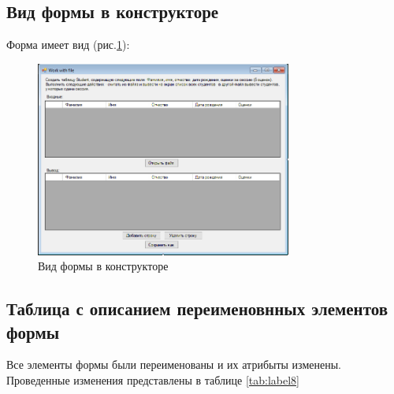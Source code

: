 \subsection{Вид формы в конструкторе}

Форма имеет вид (рис.\ref{fig:FormInConstruct8}):

\begin{figure}[!h]
    \centering
    \includegraphics[width = 0.75\textwidth]{images/Task8/FormInConstructor.png}
    \caption{Вид формы в конструкторе}
    \label{fig:FormInConstruct8}
\end{figure}


\subsection{Таблица с описанием переименовнных элементов формы}

Все элементы формы были переименованы и их атрибыты изменены. Проведенные изменения представлены в таблице \ref{tab:label8}

